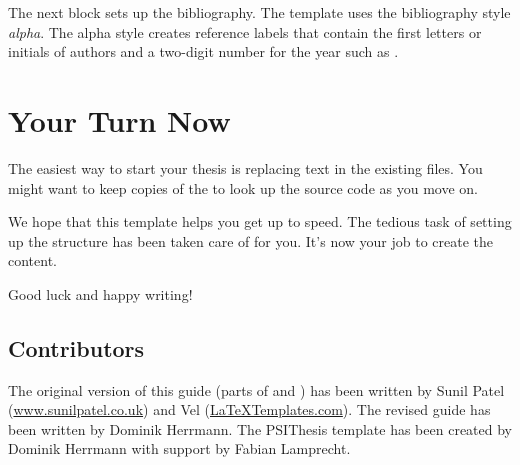 The next block sets up the bibliography. The template uses the bibliography style \emph{alpha}. The alpha style creates reference labels that contain the first letters or initials of authors and a two-digit number for the year such as \cite{Hintz02}.


\section{Your Turn Now}

The easiest way to start your thesis is replacing text in the existing files. You might want to keep copies of the  to look up the source code as you move on.

We hope that this template helps you get up to speed. The tedious task of setting up the structure has been taken care of for you. It's now your job to create the content.

Good luck and happy writing!

\subsection*{Contributors}

The original version of this guide (parts of  and ) has been written by
Sunil Patel (\href{http://www.sunilpatel.co.uk}{www.sunilpatel.co.uk}) and
Vel (\href{http://www.LaTeXTemplates.com}{LaTeXTemplates.com}).
The revised guide has been written by Dominik Herrmann. The PSIThesis template has been created by Dominik Herrmann with support by Fabian Lamprecht.

